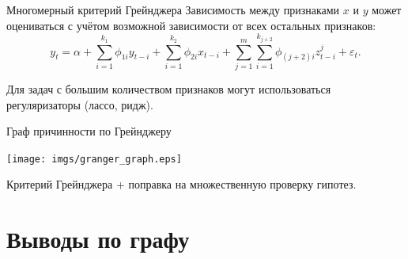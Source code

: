 \documentclass[9pt,pdf,utf8,hyperref={unicode},aspectratio=169]{beamer}
\begin{document}
\begin{frame}{Многомерный критерий Грейнджера}
    Зависимость между признаками $x$ и $y$ может оцениваться с учётом возможной зависимости от всех остальных признаков:
    $$y_t = \alpha + \sum_{i=1}^{k_1} \phi_{1i} y_{t-i} + \sum_{i=1}^{k_2} \phi_{2i} x_{t-i} + \sum_{j=1}^m \sum_{i=1}^{k_{j+2}} \phi_{(j+2)i} z^j_{t-i} + \varepsilon_t.$$

    \bigskip

    Для задач с большим количеством признаков могут использоваться регуляризаторы (лассо, ридж).
\end{frame}
 
 
 
\begin{frame}{Граф причинности по Грейнджеру}
	
    \begin{center}
        \texttt{[image: imgs/granger\_graph.eps]}
    \end{center}
    Критерий Грейнджера + поправка на множественную проверку гипотез.
\end{frame}



\section{Выводы по графу}
\end{document}

